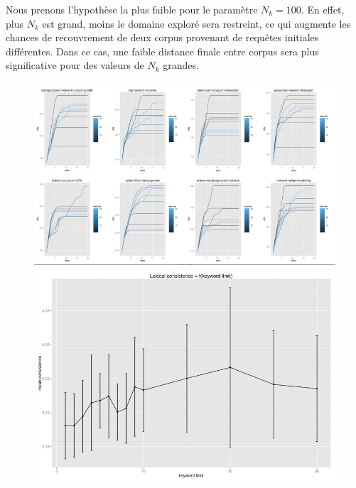 Nous prenons l'hypothèse la plus faible pour le paramètre $N_k=100$. En effet, plus $N_k$ est grand, moins le domaine exploré sera restreint, ce qui augmente les chances de recouvrement de deux corpus provenant de requêtes initiales différentes. Dans ce cas, une faible distance finale entre corpus sera plus significative pour des valeurs de $N_k$ grandes.


\begin{figure}
\includegraphics[width=\linewidth,height=0.9\textheight]{Figures/Final/A-quantepistemo-sensitivity-algosr.jpg}

\end{figure}
